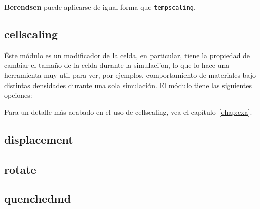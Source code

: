 
\textbf{Berendsen} puede aplicarse de igual forma que \verb|tempscaling|.

\subsection{cellscaling}
\'Este m\'odulo es un modificador de la celda, en particular, tiene la propiedad de cambiar el tama\~no de la celda durante la simulaci'on, lo que lo hace una herramienta muy util para ver, por ejemplos, comportamiento de materiales bajo distintas densidades durante una sola simulaci\'on. El m\'odulo tiene las siguientes opciones:


Para un detalle m\'as acabado en el uso de cellscaling, vea el cap\'itulo~\ref{chap:exa}.

\subsection{displacement}

\subsection{rotate}

\subsection{quenchedmd}


